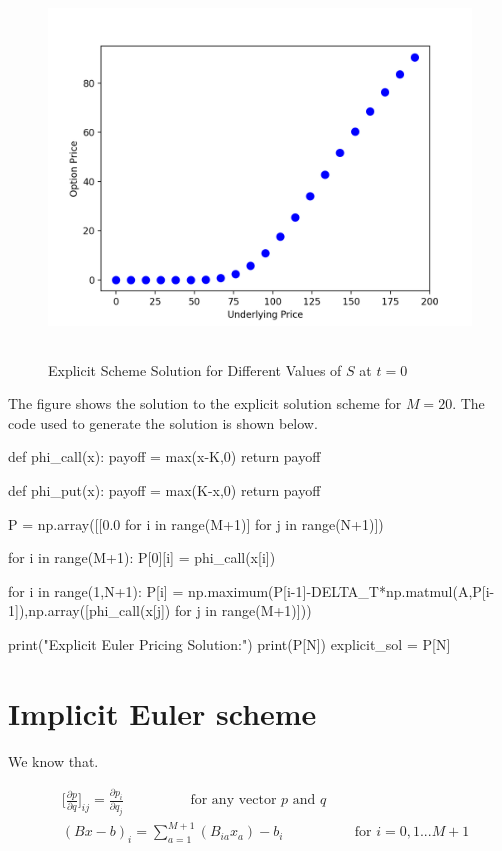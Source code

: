 \documentclass[12pt]{report}
\begin{document}
\begin{figure}[H]
	\centering
	\includegraphics[height=10cm,width=13cm]{Explicit}
	\caption{Explicit Scheme Solution for Different Values of $S$ at $t= 0$}
\end{figure}

The figure shows the solution to the explicit solution scheme for $M=20$. The code used to generate the solution is shown below.

\begin{python}
def phi_call(x):
 payoff = max(x-K,0)
 return payoff

def phi_put(x):
 payoff = max(K-x,0) 
 return payoff

P = np.array([[0.0 for i in range(M+1)] for j in range(N+1)])

for i in range(M+1):
 P[0][i] = phi_call(x[i])


for i in range(1,N+1):
 P[i] = np.maximum(P[i-1]-DELTA_T*np.matmul(A,P[i-1]),np.array([phi_call(x[j]) for j in range(M+1)])) 

print("Explicit Euler Pricing Solution:")
print(P[N])
explicit_sol = P[N]
\end{python}

\section*{Implicit Euler scheme}

We know that.

\begin{equation*}
	\begin{aligned}
		&\Bigg[\frac{\partial p}{\partial q}\Bigg]_{ij} = \frac{\partial p_i}{\partial q_j}  \hspace{2cm} \text{for any vector $p$ and $q$} \\
		& (Bx-b)_i = \sum_{a=1}^{M+1}(B_{ia}x_a)-b_i\hspace{2cm} \text{ for $i=0,1...M+1$}
	\end{aligned}
\end{equation*}
\end{document}
